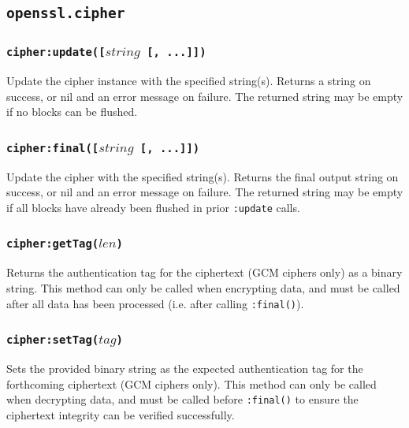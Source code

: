 \documentclass[11pt, oneside]{memoir}
\newcommand*{\fn}[1]{\texttt{#1}\xspace}
\newcounter{toccols}
\newenvironment{Module}[1]{
	\subsection{\texttt{#1}}
	\addtocontents{toc}{
		\protect\begin{multicols}{\value{toccols}}
	}
}{
	\addtocontents{toc}{\protect\end{multicols}}
}
\begin{document}
\begin{Module}{openssl.cipher}
\subsubsection[\fn{cipher:update}]{\fn{cipher:update([$string$ [, ...]])}}

Update the cipher instance with the specified string(s). Returns a string on success, or nil and an error message on failure. The returned string may be empty if no blocks can be flushed.

\subsubsection[\fn{cipher:final}]{\fn{cipher:final([$string$ [, ...]])}}

Update the cipher with the specified string(s). Returns the final output string on success, or nil and an error message on failure. The returned string may be empty if all blocks have already been flushed in prior \fn{:update} calls.

\subsubsection[\fn{cipher:getTag}]{\fn{cipher:getTag($len$)}}

Returns the authentication tag for the ciphertext (GCM ciphers only) as a binary string. This method can only be called when encrypting data, and must be called after all data has been processed (i.e. after calling \fn{:final()}).

\subsubsection[\fn{cipher:setTag}]{\fn{cipher:setTag($tag$)}}

Sets the provided binary string as the expected authentication tag for the forthcoming ciphertext (GCM ciphers only). This method can only be called when decrypting data, and must be called before \fn{:final()} to ensure the ciphertext integrity can be verified successfully.

\end{Module}
\end{document}
